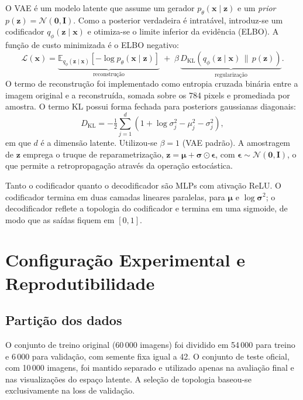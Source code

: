\documentclass[11pt,a4paper]{article}
\begin{document}
O VAE é um modelo latente que assume um gerador
$p_\theta(\mathbf{x}\mid\mathbf{z})$ e um \textit{prior} $p(\mathbf{z})=
\mathcal{N}(\mathbf{0},\mathbf{I})$. Como a posterior verdadeira é intratável,
introduz-se um codificador $q_\phi(\mathbf{z}\mid\mathbf{x})$ e otimiza-se o
limite inferior da evidência (ELBO). A função de custo minimizada é o ELBO
negativo:
\[
\mathcal{L}(\mathbf{x})=
\underbrace{\mathbb{E}_{q_\phi(\mathbf{z}\mid\mathbf{x})}
\!\left[-\log p_\theta(\mathbf{x}\mid\mathbf{z})\right]}_{\text{reconstrução}}
\;+\;
\beta\,
\underbrace{D_{\mathrm{KL}}\!\left(q_\phi(\mathbf{z}\mid\mathbf{x})\,\|\,
p(\mathbf{z})\right)}_{\text{regularização}} .
\]
O termo de reconstrução foi implementado como entropia cruzada binária entre a
imagem original e a reconstruída, somada sobre os 784 pixels e promediada por
amostra. O termo KL possui forma fechada para posteriors gaussianas
diagonais:
\[
D_{\mathrm{KL}}=-\tfrac{1}{2}\sum_{j=1}^{d}
\left(1+\log\sigma_j^2-\mu_j^2-\sigma_j^2\right),
\]
em que $d$ é a dimensão latente. Utilizou-se $\beta=1$ (VAE padrão). A
amostragem de $\mathbf{z}$ emprega o truque de reparametrização,
$\mathbf{z}=\boldsymbol{\mu}+\boldsymbol{\sigma}\odot\boldsymbol{\epsilon}$,
com $\boldsymbol{\epsilon}\sim\mathcal{N}(\mathbf{0},\mathbf{I})$, o que permite
a retropropagação através da operação estocástica.

Tanto o codificador quanto o decodificador são MLPs com ativação ReLU. O
codificador termina em duas camadas lineares paralelas, para $\boldsymbol{\mu}$
e $\log\boldsymbol{\sigma}^2$; o decodificador reflete a topologia do
codificador e termina em uma sigmoide, de modo que as saídas fiquem em $[0,1]$.

\section{Configuração Experimental e Reprodutibilidade}

\subsection{Partição dos dados}

O conjunto de treino original (60\,000 imagens) foi dividido em 54\,000 para
treino e 6\,000 para validação, com semente fixa igual a 42. O conjunto de
teste oficial, com 10\,000 imagens, foi mantido separado e utilizado apenas na
avaliação final e nas visualizações do espaço latente. A seleção de topologia
baseou-se exclusivamente na loss de validação.
\end{document}
